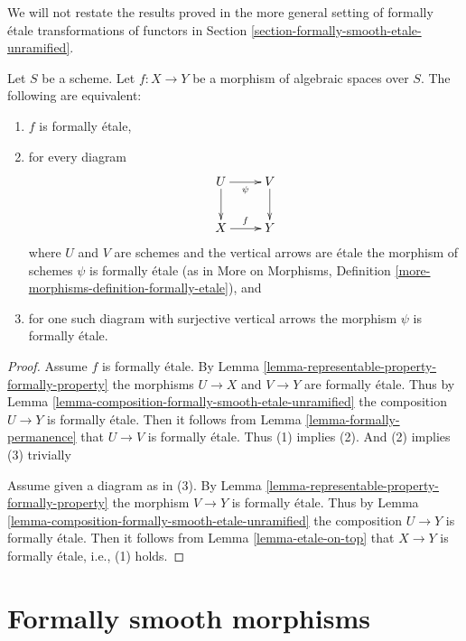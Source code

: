 \noindent
We will not restate the results proved in the more general setting of
formally \'etale transformations of functors in
Section \ref{section-formally-smooth-etale-unramified}.

\begin{lemma}
\label{lemma-formally-etale}
Let $S$ be a scheme. Let $f : X \to Y$ be a morphism of algebraic spaces over
$S$. The following are equivalent:
\begin{enumerate}
\item $f$ is formally \'etale,
\item for every diagram
$$
\xymatrix{
U \ar[d] \ar[r]_\psi & V \ar[d] \\
X \ar[r]^f & Y
}
$$
where $U$ and $V$ are schemes and the vertical arrows are \'etale
the morphism of schemes $\psi$ is formally \'etale (as in
More on Morphisms,
Definition \ref{more-morphisms-definition-formally-etale}), and
\item for one such diagram with surjective vertical arrows the morphism
$\psi$ is formally \'etale.
\end{enumerate}
\end{lemma}

\begin{proof}
Assume $f$ is formally \'etale. By
Lemma \ref{lemma-representable-property-formally-property}
the morphisms $U \to X$ and $V \to Y$ are formally \'etale. Thus by
Lemma \ref{lemma-composition-formally-smooth-etale-unramified}
the composition $U \to Y$ is formally \'etale. Then it follows from
Lemma \ref{lemma-formally-permanence}
that $U \to V$ is formally \'etale. Thus (1) implies (2). And (2)
implies (3) trivially

\medskip\noindent
Assume given a diagram as in (3). By
Lemma \ref{lemma-representable-property-formally-property}
the morphism $V \to Y$ is formally \'etale. Thus by
Lemma \ref{lemma-composition-formally-smooth-etale-unramified}
the composition $U \to Y$ is formally \'etale. Then it follows from
Lemma \ref{lemma-etale-on-top}
that $X \to Y$ is formally \'etale, i.e., (1) holds.
\end{proof}















\section{Formally smooth morphisms}
\label{section-formally-smooth}

